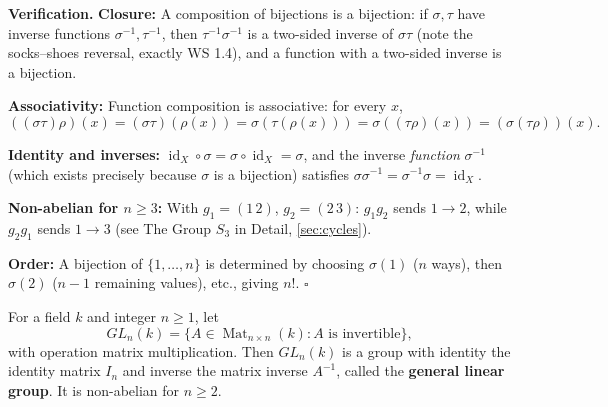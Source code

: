 \documentclass[11pt]{report}
\renewenvironment{proof}[1][Proof]{\noindent\textbf{#1.} }{\hfill$\square$\par\vspace{5pt}}
\begin{document}
\begin{proof}[Verification]
\textbf{Closure:} A composition of bijections is a bijection: if $\sigma, \tau$ have inverse functions $\sigma^{-1}, \tau^{-1}$, then $\tau^{-1} \sigma^{-1}$ is a two-sided inverse of $\sigma\tau$ (note the socks--shoes reversal, exactly WS 1.4), and a function with a two-sided inverse is a bijection.

\textbf{Associativity:} Function composition is associative: for every $x$,
\[ ((\sigma\tau)\rho)(x) = (\sigma\tau)(\rho(x)) = \sigma(\tau(\rho(x))) = \sigma((\tau\rho)(x)) = (\sigma(\tau\rho))(x). \]

\textbf{Identity and inverses:} $\operatorname{id}_X \circ \sigma = \sigma \circ \operatorname{id}_X = \sigma$, and the inverse \emph{function} $\sigma^{-1}$ (which exists precisely because $\sigma$ is a bijection) satisfies $\sigma \sigma^{-1} = \sigma^{-1} \sigma = \operatorname{id}_X$.

\textbf{Non-abelian for $n \geq 3$:} With $g_1 = (1\,2)$, $g_2 = (2\,3)$: $g_1 g_2$ sends $1 \to 2$, while $g_2 g_1$ sends $1 \to 3$ (see The Group $S_3$ in Detail, \ref{sec:cycles}).

\textbf{Order:} A bijection of $\{1, \ldots, n\}$ is determined by choosing $\sigma(1)$ ($n$ ways), then $\sigma(2)$ ($n - 1$ remaining values), etc., giving $n!$.
\end{proof}

\begin{defbox}\label{def:general-linear-groups-gln-k}
For a field $k$ and integer $n \geq 1$, let
\[ GL_n(k) = \{ A \in \operatorname{Mat}_{n \times n}(k) : A \text{ is invertible} \}, \]
with operation matrix multiplication. Then $GL_n(k)$ is a group with identity the identity matrix $I_n$ and inverse the matrix inverse $A^{-1}$, called the \textbf{general linear group}. It is non-abelian for $n \geq 2$.
\end{defbox}
\end{document}
